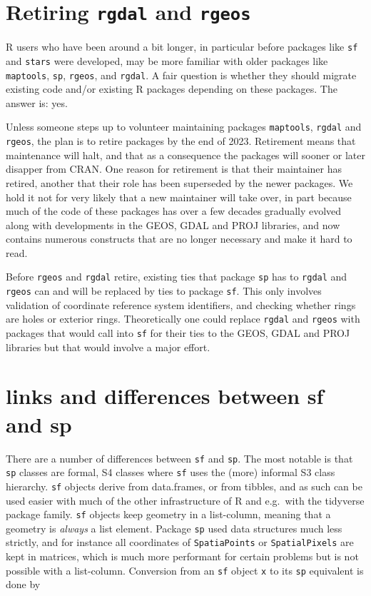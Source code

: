\documentclass[]{book}
\begin{document}
\hypertarget{retire}{%
\section{\texorpdfstring{Retiring \texttt{rgdal} and \texttt{rgeos}}{Retiring rgdal and rgeos}}\label{retire}}

R users who have been around a bit longer, in particular before
packages like \texttt{sf} and \texttt{stars} were developed, may be more familiar
with older packages like \texttt{maptools}, \texttt{sp}, \texttt{rgeos}, and \texttt{rgdal}. A
fair question is whether they should migrate existing code and/or
existing R packages depending on these packages. The answer is: yes.

Unless someone steps up to volunteer maintaining packages \texttt{maptools},
\texttt{rgdal} and \texttt{rgeos}, the plan is to retire packages by the end of
2023. Retirement means that maintenance will halt, and that as a
consequence the packages will sooner or later disapper from CRAN.
One reason for retirement is that their maintainer has retired,
another that their role has been superseded by the newer packages.
We hold it not for very likely that a new maintainer will take over,
in part because much of the code of these packages has over a few
decades gradually evolved along with developments in the GEOS,
GDAL and PROJ libraries, and now contains numerous constructs that
are no longer necessary and make it hard to read.

Before \texttt{rgeos} and \texttt{rgdal} retire, existing ties that package \texttt{sp}
has to \texttt{rgdal} and \texttt{rgeos} can and will be replaced by ties to
package \texttt{sf}. This only involves validation of coordinate reference
system identifiers, and checking whether rings are holes or exterior
rings. Theoretically one could replace \texttt{rgdal} and \texttt{rgeos} with
packages that would call into \texttt{sf} for their ties to the GEOS,
GDAL and PROJ libraries but that would involve a major effort.

\hypertarget{links-and-differences-between-sf-and-sp}{%
\section{links and differences between sf and sp}\label{links-and-differences-between-sf-and-sp}}

There are a number of differences between \texttt{sf} and \texttt{sp}. The most
notable is that \texttt{sp} classes are formal, S4 classes where \texttt{sf} uses
the (more) informal S3 class hierarchy. \texttt{sf} objects derive from
data.frames, or from tibbles, and as such can be used easier with
much of the other infrastructure of R and e.g.~with the tidyverse
package family. \texttt{sf} objects keep geometry in a list-column, meaning
that a geometry is \emph{always} a list element. Package \texttt{sp} used data
structures much less strictly, and for instance all coordinates of
\texttt{SpatiaPoints} or \texttt{SpatialPixels} are kept in matrices, which is
much more performant for certain problems but is not possible with
a list-column. Conversion from an \texttt{sf} object \texttt{x} to its \texttt{sp}
equivalent is done by
\end{document}
